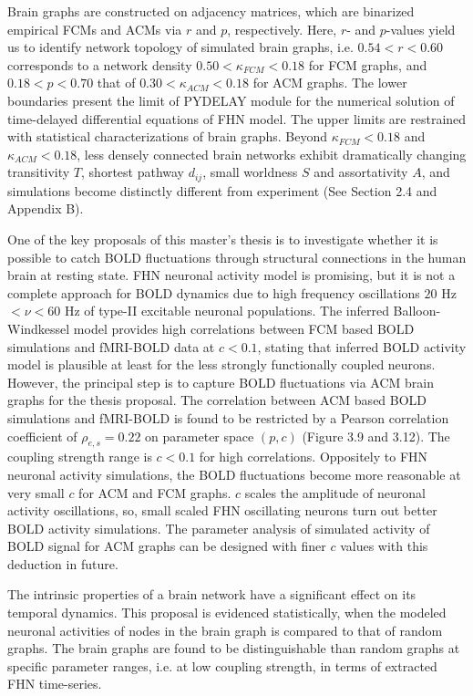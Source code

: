 Brain graphs are constructed on adjacency matrices, which are binarized empirical FCMs and ACMs via $r$ and $p$, respectively. Here, $r$- and $p$-values yield us to identify network topology of simulated brain graphs, i.e.  $0.54<r<0.60$ corresponds to a network density $0.50< \kappa_{FCM} <0.18$ for FCM graphs, and $0.18<p<0.70$ that of $0.30< \kappa_{ACM} <0.18$ for ACM graphs. The lower boundaries present the limit of \textsc{PYDELAY} module for the numerical solution of time-delayed differential equations of FHN model. The upper limits are restrained with statistical characterizations of brain graphs. Beyond $\kappa_{FCM} <0.18$ and $\kappa_{ACM}<0.18$, less densely connected brain networks exhibit dramatically changing transitivity $T$, shortest pathway $d_{ij}$, small worldness $S$ and assortativity $A$, and simulations become distinctly different from experiment (See Section 2.4 and Appendix B).

One of the key proposals of this master's thesis is to investigate whether it is possible to catch BOLD fluctuations through structural connections in the human brain at resting state. FHN neuronal activity model is promising, but it is not a complete approach for BOLD dynamics due to high frequency oscillations $20$ Hz $< \nu <60 $ Hz of type-II excitable neuronal populations. The inferred Balloon-Windkessel model provides high correlations between FCM based BOLD simulations and fMRI-BOLD data at $c<0.1$, stating that inferred BOLD activity model is plausible at least for the less strongly functionally coupled neurons. However, the principal step is to capture BOLD fluctuations via ACM brain graphs for the thesis proposal. The correlation between ACM based BOLD simulations and fMRI-BOLD is found to be restricted by a Pearson correlation coefficient of $\rho_{e,s}=0.22$ on parameter space $(p,c)$ (Figure 3.9 and 3.12). The coupling strength range is $c<0.1$ for high correlations. Oppositely to FHN neuronal activity simulations, the BOLD fluctuations become more reasonable at very small $c$ for ACM and FCM graphs. $c$ scales the amplitude of neuronal activity oscillations, so, small scaled FHN  oscillating neurons turn out better BOLD activity simulations. The parameter analysis of simulated activity of BOLD signal for ACM graphs can be designed with finer $c$ values with this deduction in future. 

The intrinsic properties of a brain network have a significant effect on its temporal dynamics. This proposal is evidenced statistically, when the modeled neuronal activities of nodes in the brain graph is compared to that of random graphs. The brain graphs are found to be distinguishable than random graphs at specific parameter ranges, i.e. at low coupling strength, in terms of extracted FHN time-series. 
 

 
